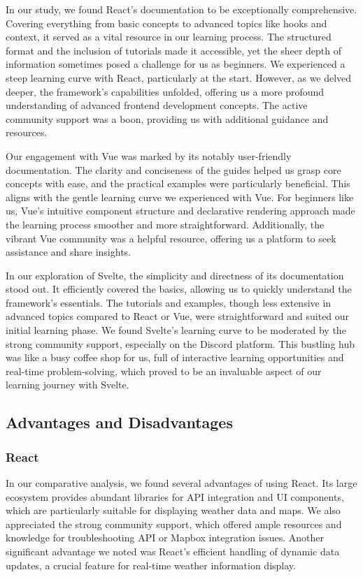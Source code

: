 In our study, we found React's documentation to be exceptionally comprehensive. Covering everything from basic concepts to advanced topics like hooks and context, it served as a vital resource in our learning process. The structured format and the inclusion of tutorials made it accessible, yet the sheer depth of information sometimes posed a challenge for us as beginners. We experienced a steep learning curve with React, particularly at the start. However, as we delved deeper, the framework's capabilities unfolded, offering us a more profound understanding of advanced frontend development concepts. The active community support was a boon, providing us with additional guidance and resources.

Our engagement with Vue was marked by its notably user-friendly documentation. The clarity and conciseness of the guides helped us grasp core concepts with ease, and the practical examples were particularly beneficial. This aligns with the gentle learning curve we experienced with Vue. For beginners like us, Vue's intuitive component structure and declarative rendering approach made the learning process smoother and more straightforward. Additionally, the vibrant Vue community was a helpful resource, offering us a platform to seek assistance and share insights.

In our exploration of Svelte, the simplicity and directness of its documentation stood out. It efficiently covered the basics, allowing us to quickly understand the framework's essentials. The tutorials and examples, though less extensive in advanced topics compared to React or Vue, were straightforward and suited our initial learning phase. We found Svelte's learning curve to be moderated by the strong community support, especially on the Discord platform. This bustling hub was like a busy coffee shop for us, full of interactive learning opportunities and real-time problem-solving, which proved to be an invaluable aspect of our learning journey with Svelte.

\subsection{Advantages and Disadvantages}

\subsubsection{React}

In our comparative analysis, we found several advantages of using React. Its large ecosystem provides abundant libraries for API integration and UI components, which are particularly suitable for displaying weather data and maps. We also appreciated the strong community support, which offered ample resources and knowledge for troubleshooting API or Mapbox integration issues. Another significant advantage we noted was React's efficient handling of dynamic data updates, a crucial feature for real-time weather information display.


